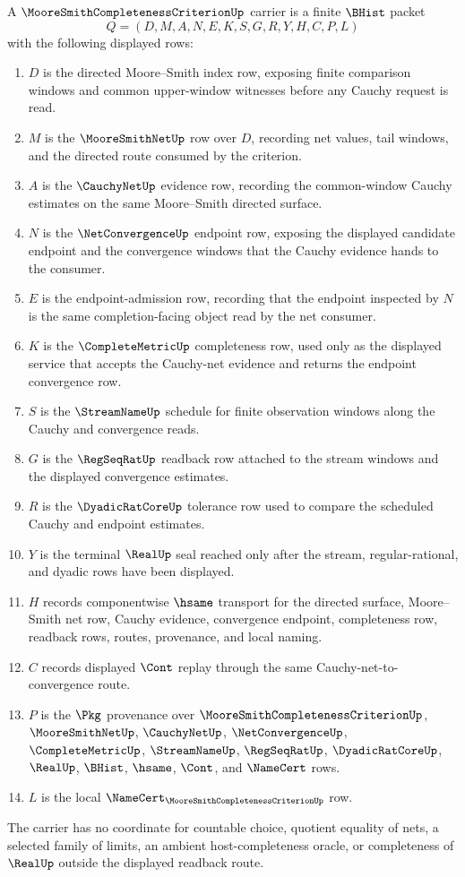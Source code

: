 \begin{definition}
\label{def:moore-smith-completeness-criterion-carrier}
A $\MooreSmithCompletenessCriterionUp$ carrier is a finite $\BHist$ packet
$$
Q=(D,M,A,N,E,K,S,G,R,Y,H,C,P,L)
$$
with the following displayed rows:
\begin{enumerate}
\item $D$ is the directed Moore--Smith index row, exposing finite comparison windows and common upper-window witnesses before any Cauchy request is read.
\item $M$ is the $\MooreSmithNetUp$ row over $D$, recording net values, tail windows, and the directed route consumed by the criterion.
\item $A$ is the $\CauchyNetUp$ evidence row, recording the common-window Cauchy estimates on the same Moore--Smith directed surface.
\item $N$ is the $\NetConvergenceUp$ endpoint row, exposing the displayed candidate endpoint and the convergence windows that the Cauchy evidence hands to the consumer.
\item $E$ is the endpoint-admission row, recording that the endpoint inspected by $N$ is the same completion-facing object read by the net consumer.
\item $K$ is the $\CompleteMetricUp$ completeness row, used only as the displayed service that accepts the Cauchy-net evidence and returns the endpoint convergence row.
\item $S$ is the $\StreamNameUp$ schedule for finite observation windows along the Cauchy and convergence reads.
\item $G$ is the $\RegSeqRatUp$ readback row attached to the stream windows and the displayed convergence estimates.
\item $R$ is the $\DyadicRatCoreUp$ tolerance row used to compare the scheduled Cauchy and endpoint estimates.
\item $Y$ is the terminal $\RealUp$ seal reached only after the stream, regular-rational, and dyadic rows have been displayed.
\item $H$ records componentwise $\hsame$ transport for the directed surface, Moore--Smith net row, Cauchy evidence, convergence endpoint, completeness row, readback rows, routes, provenance, and local naming.
\item $C$ records displayed $\Cont$ replay through the same Cauchy-net-to-convergence route.
\item $P$ is the $\Pkg$ provenance over $\MooreSmithCompletenessCriterionUp$, $\MooreSmithNetUp$, $\CauchyNetUp$, $\NetConvergenceUp$, $\CompleteMetricUp$, $\StreamNameUp$, $\RegSeqRatUp$, $\DyadicRatCoreUp$, $\RealUp$, $\BHist$, $\hsame$, $\Cont$, and $\NameCert$ rows.
\item $L$ is the local $\NameCert_{\MooreSmithCompletenessCriterionUp}$ row.
\end{enumerate}
The carrier has no coordinate for countable choice, quotient equality of nets, a selected family of limits, an ambient host-completeness oracle, or completeness of $\RealUp$ outside the displayed readback route.
\end{definition}

